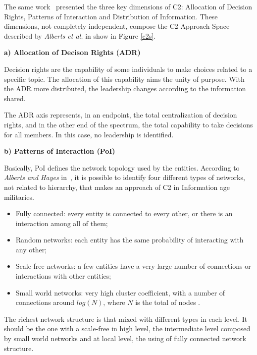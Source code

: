The same work~\cite{Power01} presented the three key dimensions of C2: Allocation of Decision Rights, Patterns of Interaction and Distribution of Information. These dimensions, not completely independent, compose the C2 Approach Space described by \textit{Alberts et al.} in \cite{Alberts2006} show in Figure \ref{c2s}.

%

\textbf{a) Allocation of Decison Rights (ADR)}

Decision rights are the capability of some individuals to make choices related to a specific topic. The allocation of this capability aims the unity of purpose. With the ADR more distributed, the leadership changes according to the information shared.

The ADR axis represents, in an endpoint, the total centralization of decision rights, and in the other end of the spectrum, the total capability to take decisions for all members. In this case, no leadership is identified.

\textbf{b) Patterns of Interaction (PoI)}

Basically, PoI defines the network topology used by the entities. According to \textit{Alberts and Hayes} in~\cite{Alberts2006}, it is possible to identify four different types of networks, not related to hierarchy, that makes an approach of C2 in Information age militaries.

\begin{itemize}
    \item Fully connected: every entity is connected to every other, or there is an interaction among all of them;
    \item Random networks: each entity has the same probability of interacting with any other;
    \item Scale-free networks: a few entities have a very large number of connections or interactions with other entities;
    \item Small world networks: very high cluster coefficient, with a number of connections around $log(N)$, where $N$ is the total of nodes \cite{small01}.
\end{itemize}
 
The richest network structure is that mixed with different types in each level\cite{Alberts2006}. It should be the one with a scale-free in high level, the intermediate level composed by small world networks and at local level, the using of fully connected network structure.

